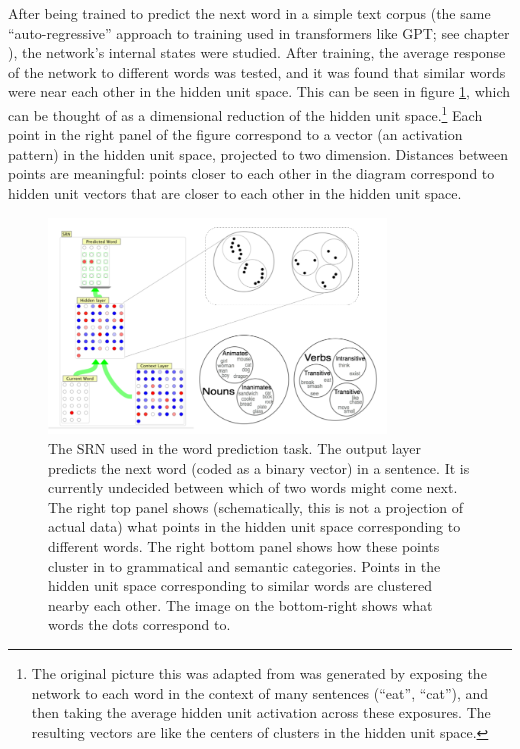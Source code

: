 After being trained to predict the next word in a simple text corpus (the same ``auto-regressive'' approach to training used in transformers like GPT; see chapter ), the network's internal states were studied. After training, the average response of the network to different words was tested, and it was found that similar words were near each other in the hidden unit space. This can be seen in figure \ref{elman_srn_categories}, which can be thought of as a dimensional reduction of the hidden unit space.\footnote{The original picture this was adapted from was generated by exposing the network to each word in the context of many sentences (\eg ``eat'', ``cat''), and then taking the average hidden unit activation across these exposures. The resulting vectors are like the centers of clusters in the hidden unit space.}  Each point in the right panel of the figure correspond to a vector (an activation pattern) in the hidden unit space, projected to two dimension. Distances between points are meaningful: points closer to each other in the diagram correspond to hidden unit vectors that are closer to each other in the hidden unit space. 

\begin{figure}[h]
\centering
\includegraphics[width=0.8\textwidth]{images/elmanCategoriesSpace.png}
\caption[Jeff Yoshimi.]{The SRN used in the word prediction task. The output layer predicts the next word (coded as a binary vector) in a sentence. It is currently undecided between which of two words might come next. The right top panel shows (schematically, this is not a projection of actual data) what points in the hidden unit space corresponding to different words. The right bottom panel shows how these points cluster in to grammatical and semantic categories. Points in the hidden unit space corresponding to similar words are clustered nearby each other. The image on the bottom-right shows what words the dots correspond to.}
\label{elman_srn_categories}
\end{figure}

